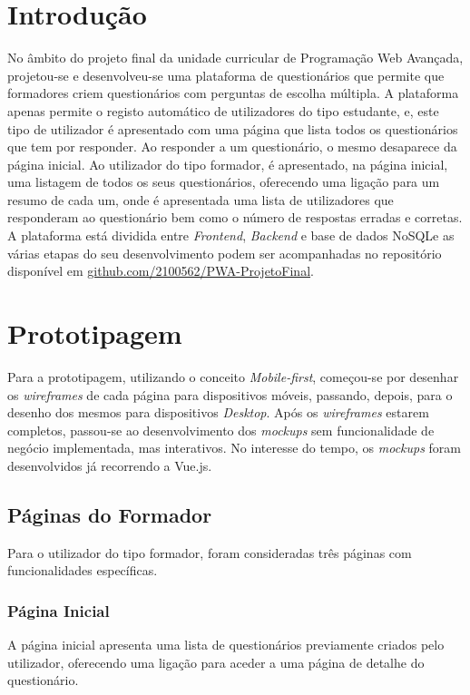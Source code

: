 \documentclass[12pt,a4paper,final]{article}
\begin{document}
    \section{Introdução}\label{sec:introducao}
    No âmbito do projeto final da unidade curricular de Programação Web Avançada, projetou-se e desenvolveu-se uma plataforma de questionários que permite que formadores criem questionários com perguntas de escolha múltipla.
    A plataforma apenas permite o registo automático de utilizadores do tipo estudante, e, este tipo de utilizador é apresentado com uma página que lista todos os questionários que tem por responder.
    Ao responder a um questionário, o mesmo desaparece da página inicial.
    Ao utilizador do tipo formador, é apresentado, na página inicial, uma listagem de todos os seus questionários, oferecendo uma ligação para um resumo de cada um, onde é apresentada uma lista de utilizadores que responderam ao questionário bem como o número de respostas erradas e corretas.
    A plataforma está dividida entre \textit{Frontend}, \textit{Backend} e base de dados NoSQL\@ e as várias etapas do seu desenvolvimento podem ser acompanhadas no repositório disponível em \href{https://github.com/2100562/PWA-ProjetoFinal}{github.com/2100562/PWA-ProjetoFinal}.


    \section{Prototipagem}\label{sec:prototipagem}
    Para a prototipagem, utilizando o conceito \textit{Mobile-first}, começou-se por desenhar os \textit{wireframes} de cada página para dispositivos móveis, passando, depois, para o desenho dos mesmos para dispositivos \textit{Desktop}.
    Após os \textit{wireframes} estarem completos, passou-se ao desenvolvimento dos \textit{mockups} sem funcionalidade de negócio implementada, mas interativos.
    No interesse do tempo, os \textit{mockups} foram desenvolvidos já recorrendo a Vue.js.

    \subsection{Páginas do Formador}\label{subsec:paginas-do-formador}
    Para o utilizador do tipo formador, foram consideradas três páginas com funcionalidades específicas.

    \subsubsection{Página Inicial}
    A página inicial apresenta uma lista de questionários previamente criados pelo utilizador, oferecendo uma ligação para aceder a uma página de detalhe do questionário.
\end{document}
